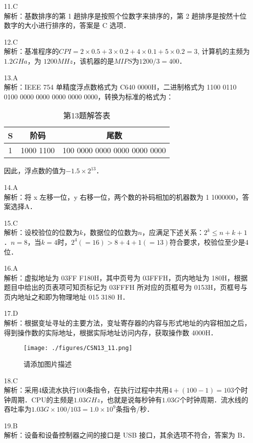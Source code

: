 11.C \\
解析：基数排序的第 1 趟排序是按照个位数字来排序的，第 2 趟排序是按然十位数字的大小进行排序的，答案是 C 选项． 

12.C \\
解析：基准程序的$CPI=2 \times 0.5 + 3 \times 0.2 + 4 \times 0.1 + 5 \times 0.2 = 3$, 计算机的主频为$1.2GHa$，为 $1200MHz$，该机器的是$MIPS$为$1 200/3=400$．

13.A \\
解析：IEEE 754 单精度浮点数格式为 C640 0000H，二进制格式为 1100 0110 0100 0000 0000 0000 0000 0000，转换为标准的格式为： 
\begin{table}[ht]
\centering
\caption{第13题解答表}\label{CSN13_tab7}
\begin{tabular}{|c|c|c|}
\hline
S & 阶码 & 尾数 \\
\hline
1 & 1000 1100 & 100 0000 0000 0000 0000 0000 \\
\hline
\end{tabular}
\end{table}
因此，浮点数的值为$-1.5 \times 2^{13}$．

14.A \\
解析：将 x 左移一位，y 右移一位，两个数的补码相加的机器数为 1 1000000，答案选择A．

15.C \\
解析：设校验位的位数为$k$，数据位的位数为$n$，应满足下述关系：$2^k \leq n+k+1$．$n=8$，当$k=4$时，$2^4(=16)>8+4+1(=13)$符合要求，校验位至少是4位．

16.A \\
解析：虚拟地址为 03FF F180H，其中页号为 03FFFH，页内地址为 180H，根据题目中给出的页表项可知页标记为 03FFFH 所对应的页框号为 0153H，页框号与页内地址之和即为物理地址 015 3180 H．

17.D \\
解析：根据变址寻址的主要方法，变址寄存器的内容与形式地址的内容相加之后，得到操作数的实际地址，根据实际地址访问内存，获取操作数 4000H．
\begin{figure}[ht]
\centering
\texttt{[image: ./figures/CSN13\_11.png]}
\caption{请添加图片描述} \label{CSN13_fig11}
\end{figure}

18.C \\
解析：采用4级流水执行100条指令，在执行过程中共用$4+(100-1)=103$个时钟周期．CPU的主频是$1.03GHz$，也就是说每秒钟有$1.03G$个时钟周期．流水线的吞吐率为$1.03G\times100/103=1.0\times10^9$条指令/秒．

19.B \\
解析：设备和设备控制器之间的接口是 USB 接口，其余选项不符合，答案为 B．

